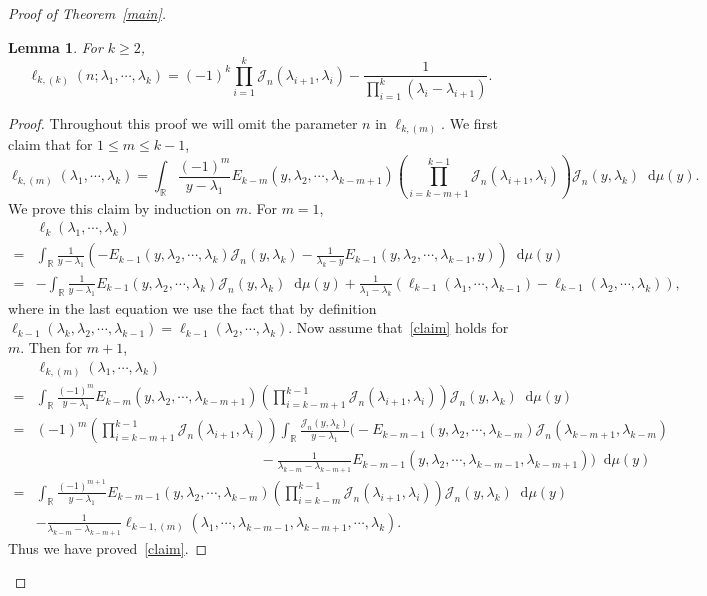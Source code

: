 \documentclass[a4paper]{article}
\theoremstyle{plain}
\newtheorem{lem}{Lemma}
\theoremstyle{definition}
\newcommand{\dif}{\mathop{}\!\mathrm{d}}
\newcommand{\RR}{\mathbb{R}}
\newcommand{\nn}{\nonumber}
\begin{document}
\begin{proof}[Proof of Theorem~\ref{main}]
\begin{lem}
	For $k\ge2$,
	\begin{equation}
		\ell_{k,(k)}(n;\lambda_1,\cdots,\lambda_k)=(-1)^k\prod_{i=1}^k\mathcal J_n(\lambda_{i+1},\lambda_i)-\frac{1}{\prod_{i=1}^k(\lambda_i-\lambda_{i+1})}. \label{lkk}
	\end{equation}
\end{lem}
\begin{proof}
	Throughout this proof we will omit the parameter $n$ in $\ell_{k,(m)}$. We first claim that for $1\le m\le k-1$,
	\begin{equation}
		\ell_{k,(m)}(\lambda_1,\cdots,\lambda_k)=\int_\RR\frac{(-1)^m}{y-\lambda_1}E_{k-m}(y,\lambda_2,\cdots,\lambda_{k-m+1})\left(\prod_{i=k-m+1}^{k-1}\mathcal J_n(\lambda_{i+1},\lambda_i)\right)\mathcal J_n(y,\lambda_k)\dif\mu(y). \label{claim}
	\end{equation} We prove this claim by induction on $m$. For $m=1$,
	\begin{align}
		&\ell_k(\lambda_1,\cdots,\lambda_k)\nn\\
		=&\int_\RR\frac{1}{y-\lambda_1}\left(-E_{k-1}(y,\lambda_2,\cdots,\lambda_k)\mathcal J_n(y,\lambda_k)-\frac{1}{\lambda_k-y}E_{k-1}(y,\lambda_2,\cdots,\lambda_{k-1},y)\right)\dif\mu(y)\nn\\
		=&-\int_\RR\frac{1}{y-\lambda_1}E_{k-1}(y,\lambda_2,\cdots,\lambda_k)\mathcal J_n(y,\lambda_k)\dif\mu(y)+\frac{1}{\lambda_1-\lambda_k}(\ell_{k-1}(\lambda_1,\cdots,\lambda_{k-1})-\ell_{k-1}(\lambda_2,\cdots,\lambda_k)),
	\end{align} 
	where in the last equation we use the fact that by definition $\ell_{k-1}(\lambda_k,\lambda_2,\cdots,\lambda_{k-1})=\ell_{k-1}(\lambda_2,\cdots,\lambda_k)$. Now assume that~\eqref{claim} holds for $m$. Then for $m+1$,
	\begin{align}
		&\ell_{k,(m)}(\lambda_1,\cdots,\lambda_k)\nn\\
		=&\int_\RR\frac{(-1)^m}{y-\lambda_1}E_{k-m}(y,\lambda_2,\cdots,\lambda_{k-m+1})\left(\prod_{i=k-m+1}^{k-1}\mathcal J_n(\lambda_{i+1},\lambda_i)\right)\mathcal J_n(y,\lambda_k)\dif\mu(y)\nn\\
		=&(-1)^m\left(\prod_{i=k-m+1}^{k-1}\mathcal J_n(\lambda_{i+1},\lambda_i)\right)\int_\RR\frac{\mathcal J_n(y,\lambda_k)}{y-\lambda_1}\bigg(-E_{k-m-1}(y,\lambda_2,\cdots,\lambda_{k-m})\mathcal J_n(\lambda_{k-m+1},\lambda_{k-m})\nn\\
		&\qquad\qquad\qquad\qquad\qquad\qquad\qquad\qquad-\frac{1}{\lambda_{k-m}-\lambda_{k-m+1}}E_{k-m-1}(y,\lambda_2,\cdots,\lambda_{k-m-1},\lambda_{k-m+1})\bigg)\dif\mu(y)\nn\\
		=&\int_\RR\frac{(-1)^{m+1}}{y-\lambda_1}E_{k-m-1}(y,\lambda_2,\cdots,\lambda_{k-m})\left(\prod_{i=k-m}^{k-1}\mathcal J_n(\lambda_{i+1},\lambda_i)\right)\mathcal J_n(y,\lambda_k)\dif\mu(y)\nn\\
		&-\frac{1}{\lambda_{k-m}-\lambda_{k-m+1}}\ell_{k-1,(m)}(\lambda_1,\cdots,\lambda_{k-m-1},\lambda_{k-m+1},\cdots,\lambda_k).
	\end{align} Thus we have proved~\eqref{claim}.
	

\end{proof}
\end{proof}
\end{document}
